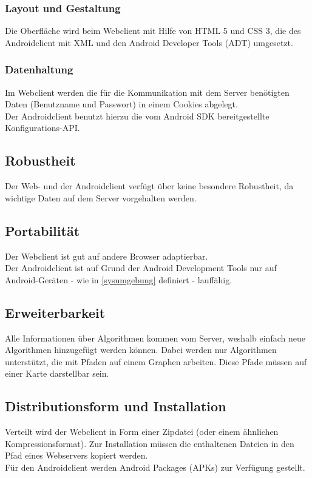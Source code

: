 \documentclass[a4paper,10pt,titlepage]{article}
\begin{document}
\subsubsection{Layout und Gestaltung}
Die Oberfläche wird beim Webclient mit Hilfe von HTML 5 und CSS 3, die des Androidclient mit XML und den Android Developer Tools (ADT) umgesetzt.

\subsubsection{Datenhaltung} \label{datenhaltung}
Im Webclient werden die für die Kommunikation mit dem Server benötigten Daten (Benutzname und Passwort) in einem Cookies abgelegt.\\
Der Androidclient benutzt hierzu die vom Android SDK bereitgestellte Konfigurations-API.

\subsection{Robustheit}
Der Web- und der Androidclient verfügt über keine besondere Robustheit, da wichtige Daten auf dem Server vorgehalten werden.

\subsection{Portabilität}
Der Webclient ist gut auf andere Browser adaptierbar.\\
Der Androidclient ist auf Grund der Android Development Tools nur auf Android-Geräten - wie in \ref{sysumgebung} definiert - lauffähig.

\subsection{Erweiterbarkeit}
Alle Informationen über Algorithmen kommen vom Server, weshalb einfach neue Algorithmen hinzugefügt werden können.
Dabei werden nur Algorithmen unterstützt, die mit Pfaden auf einem Graphen arbeiten. Diese Pfade müssen auf einer Karte darstellbar sein.

\subsection{Distributionsform und Installation}
Verteilt wird der Webclient in Form einer Zipdatei (oder einem ähnlichen Kompressionsformat). Zur Installation müssen die enthaltenen Dateien in den Pfad eines Webservers kopiert werden.\\
Für den Androidclient werden Android Packages (APKs) zur Verfügung gestellt.
\end{document}
